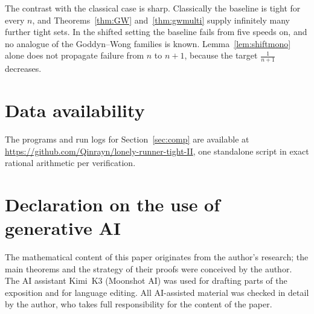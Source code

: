 \documentclass[11pt]{article}
\theoremstyle{definition}
\begin{document}
The contrast with the classical case is sharp. Classically the baseline
is tight for every $n$, and Theorems~\ref{thm:GW} and~\ref{thm:gwmulti}
supply infinitely many further tight sets. In the shifted setting the
baseline fails from five speeds on, and no analogue of the
Goddyn--Wong families is known. Lemma~\ref{lem:shiftmono} alone does
not propagate failure from $n$ to $n+1$, because the target
$\frac1{n+1}$ decreases.

\section*{Data availability}
The programs and run logs for Section~\ref{sec:comp} are available at
\url{https://github.com/Qinrayn/lonely-runner-tight-II}, one standalone
script in exact rational arithmetic per verification.

\section*{Declaration on the use of generative AI}
The mathematical content of this paper originates from the author's
research; the main theorems and the strategy of their proofs were
conceived by the author. The AI assistant Kimi~K3 (Moonshot AI) was
used for drafting parts of the exposition and for language editing.
All AI-assisted material was checked in detail by the author, who
takes full responsibility for the content of the paper.
\end{document}
